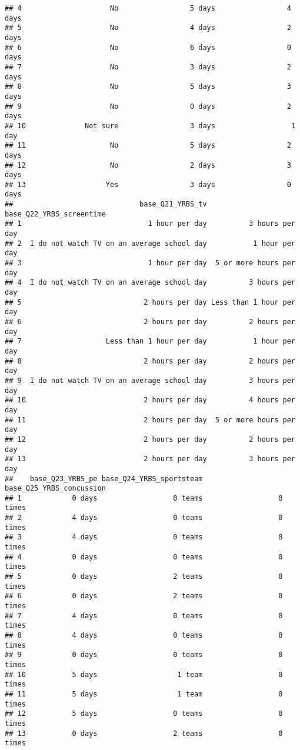 \documentclass[]{article}
\begin{document}
\begin{verbatim}
## 4                     No                 5 days                 4 days
## 5                     No                 4 days                 2 days
## 6                     No                 6 days                 0 days
## 7                     No                 3 days                 2 days
## 8                     No                 5 days                 3 days
## 9                     No                 0 days                 2 days
## 10              Not sure                 3 days                  1 day
## 11                    No                 5 days                 2 days
## 12                    No                 2 days                 3 days
## 13                   Yes                 3 days                 0 days
##                              base_Q21_YRBS_tv base_Q22_YRBS_screentime
## 1                              1 hour per day          3 hours per day
## 2  I do not watch TV on an average school day           1 hour per day
## 3                              1 hour per day  5 or more hours per day
## 4  I do not watch TV on an average school day          3 hours per day
## 5                             2 hours per day Less than 1 hour per day
## 6                             2 hours per day          2 hours per day
## 7                    Less than 1 hour per day           1 hour per day
## 8                             2 hours per day          2 hours per day
## 9  I do not watch TV on an average school day          3 hours per day
## 10                            2 hours per day          4 hours per day
## 11                            2 hours per day  5 or more hours per day
## 12                            2 hours per day          2 hours per day
## 13                            2 hours per day          3 hours per day
##    base_Q23_YRBS_pe base_Q24_YRBS_sportsteam base_Q25_YRBS_concussion
## 1            0 days                  0 teams                  0 times
## 2            4 days                  0 teams                  0 times
## 3            4 days                  0 teams                  0 times
## 4            0 days                  0 teams                  0 times
## 5            0 days                  2 teams                  0 times
## 6            0 days                  2 teams                  0 times
## 7            4 days                  0 teams                  0 times
## 8            4 days                  0 teams                  0 times
## 9            0 days                  0 teams                  0 times
## 10           5 days                   1 team                  0 times
## 11           5 days                   1 team                  0 times
## 12           5 days                  0 teams                  0 times
## 13           0 days                  2 teams                  0 times
\end{verbatim}
\end{document}
